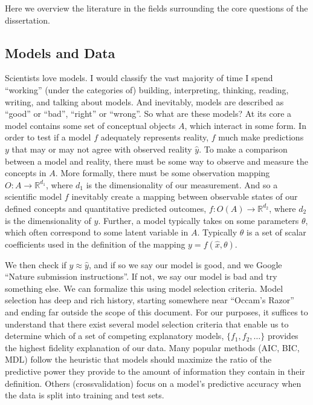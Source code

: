 \documentclass[]{article}
\begin{document}
Here we overview the literature in the fields surrounding the core
questions of the dissertation.

\hypertarget{models-and-data}{%
\subsection{Models and Data}\label{models-and-data}}

Scientists love models. I would classify the vast majority of time I
spend ``working'' (under the categories of) building, interpreting,
thinking, reading, writing, and talking about models. And inevitably,
models are described as ``good'' or ``bad'', ``right'' or ``wrong''. So
what are these models? At its core a model contains some set of
conceptual objects \(A\), which interact in some form. In order to test
if a model \(f\) adequately represents reality, \(f\) much make
predictions \(y\) that may or may not agree with observed reality
\(\hat{y}\). To make a comparison between a model and reality, there
must be some way to observe and measure the concepts in \(A\). More
formally, there must be some observation mapping
\(O: A \to \mathbb{R}^{d_1}\), where \(d_1\) is the dimensionality of
our measurement. And so a scientific model \(f\) inevitably create a
mapping between observable states of our defined concepts and
quantitative predicted outcomes, \(f : O(A) \to \mathbb{R}^{d_2}\),
where \(d_2\) is the dimensionality of \(y\). Further, a model typically
takes on some parameters \(\theta\), which often correspond to some
latent variable in \(A\). Typically \(\theta\) is a set of scalar
coefficients used in the definition of the mapping
\(y = f(\hat{x}, \theta)\).

We then check if \(y \approx \hat{y}\), and if so we say our model is
good, and we Google ``Nature submission instructions''. If not, we say
our model is bad and try something else. We can formalize this using
model selection criteria. Model selection has deep and rich history,
starting somewhere near ``Occam's Razor'' and ending far outside the
scope of this document. For our purposes, it suffices to understand that
there exist several model selection criteria that enable us to determine
which of a set of competing explanatory models, \(\{f_1, f_2, \dots\}\)
provides the highest fidelity explanation of our data. Many popular
methods (AIC, BIC, MDL) follow the heuristic that models should maximize
the ratio of the predictive power they provide to the amount of
information they contain in their definition. Others (crossvalidation)
focus on a model's predictive accuracy when the data is split into
training and test sets.
\end{document}
